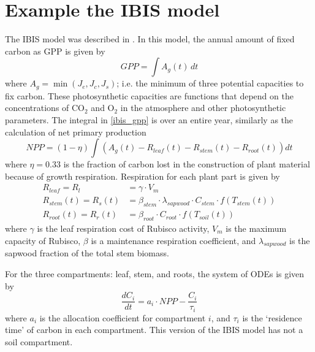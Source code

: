 \documentclass[11pt,a4paper]{article}
\begin{document}
\section{Example the IBIS model}
The IBIS model was described in \citet{Foley1996GBC}. In this model, the annual amount of fixed carbon as GPP is given by
\begin{equation} \label{ibis_gpp}
GPP = \int A_g(t) \, dt 
\end{equation}
where $A_g = \min (J_e, J_c, J_s)$; i.e. the minimum of three potential capacities to fix carbon. These photosynthetic capacities are functions that depend on the concentrations of CO$_2$ and O$_2$ in the atmosphere and other photosynthetic parameters. The integral in \eqref{ibis_gpp} is over an entire year, similarly as the calculation of net primary production
\begin{equation}
NPP = (1 - \eta) \int (A_g(t) - R_{leaf}(t) - R_{stem}(t) - R_{root}(t)) dt
\end{equation}
where $\eta =0.33$ is the fraction of carbon lost in the construction of plant material because of growth respiration. Respiration for each plant part is given by
\begin{align}
R_{leaf} = R_l &= \gamma \cdot V_m \\
R_{stem}(t) = R_s(t) &= \beta_{stem} \cdot \lambda_{sapwood} \cdot C_{stem} \cdot f(T_{stem}(t)) \\
R_{root}(t) = R_r(t) &= \beta_{root} \cdot C_{root} \cdot f(T_{soil}(t))
\end{align}
where $\gamma$ is the leaf respiration cost of Rubisco activity, $V_m$ is the maximum capacity of Rubisco, $\beta$ is a maintenance respiration coefficient, and $\lambda_{sapwood}$ is the sapwood fraction of the total stem biomass. 

For the three compartments: leaf, stem, and roots, the system of ODEs is given by
\begin{equation}
\frac{dC_i}{dt} = a_i \cdot NPP - \frac{C_i}{\tau_i}
\end{equation}
where $a_i$ is the allocation coefficient for compartment $i$, and $\tau_i$ is the `residence time' of carbon in each compartment. This version of the IBIS model has not a soil compartment.
\end{document}
